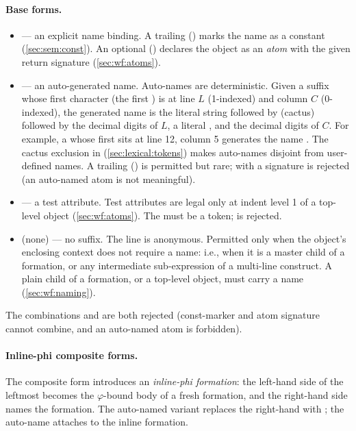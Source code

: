 \paragraph{Base forms.}
\begin{itemize}
  \item {} --- an explicit name binding.
    A trailing \ff{!} () marks the name as a constant
    (\cref{sec:sem:const}).
    An optional  () declares the object as an
    \emph{atom} with the given return signature (\cref{sec:wf:atoms}).
  \item \ff{>>} --- an auto-generated name.
    Auto-names are deterministic.
    Given a \ff{>>} suffix whose first character (the first \ff{>}) is
    at line \(L\) (1-indexed) and column \(C\) (0-indexed),
    the generated name is the literal string
     followed by  (cactus)
    followed by the decimal digits of \(L\),
    a literal \ff{-},
    and the decimal digits of \(C\).
    For example, a \ff{>>} whose first \ff{>} sits at line 12, column 5
    generates the name .
    The cactus exclusion in  (\cref{sec:lexical:tokens}) makes
    auto-names disjoint from user-defined names.
    A trailing \ff{!} (\ff{>>!}) is permitted but rare;
    \ff{>>} with a  signature is rejected (an auto-named atom is
    not meaningful).
  \item {} --- a test attribute.
    Test attributes are legal only at indent level 1 of a top-level object
    (\cref{sec:wf:atoms}).
    The  must be a  token;  is rejected.
  \item (none) --- no suffix.
    The line is anonymous.
    Permitted only when the object's enclosing context does not require
    a name: i.e., when it is a master child of a formation, or any
    intermediate sub-expression of a multi-line construct.
    A plain child of a formation, or a top-level object, must carry a
    name (\cref{sec:wf:naming}).
\end{itemize}

The combinations  and  are both rejected
  (const-marker and atom signature cannot combine, and an auto-named atom
  is forbidden).

\paragraph{Inline-phi composite forms.}
The composite form  introduces an
  \emph{inline-phi formation}:
  the left-hand side of the leftmost \ff{> [} becomes the \(\varphi\)-bound
  body of a fresh formation, and the right-hand side names the formation.
The auto-named variant \ff{> [params] >>} replaces the right-hand
   with \ff{>>}; the auto-name attaches to the inline formation.

